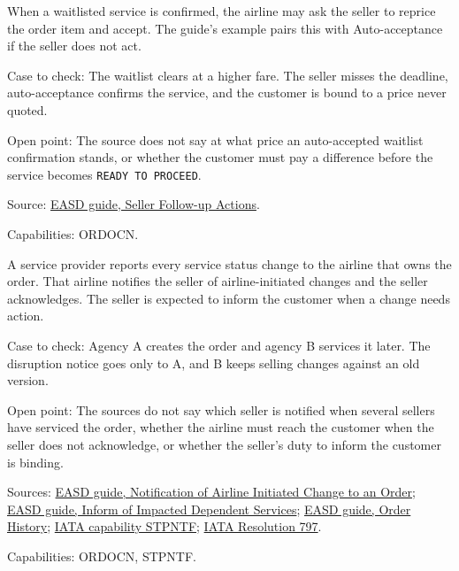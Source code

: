 \begin{definition}
  \label{def:airline-change-reprice-and-accept}
  \notready
  When a waitlisted service is confirmed, the airline may ask the seller to
  reprice the order item and accept. The guide's example pairs this with
  Auto-acceptance if the seller does not act.

  Case to check: The waitlist clears at a higher fare. The seller misses the
  deadline, auto-acceptance confirms the service, and the customer is bound
  to a price never quoted.

  Open point: The source does not say at what price an auto-accepted
  waitlist confirmation stands, or whether the customer must pay a
  difference before the service becomes \texttt{READY TO PROCEED}.

  Source: \href{https://standards.atlassian.net/wiki/spaces/EASD/pages/574849094}{EASD guide, Seller Follow-up Actions}.

  Capabilities: ORDOCN.
\end{definition}

\begin{definition}
  \label{def:airline-change-notice-chain}
  \notready
  A service provider reports every service status change to the airline that
  owns the order. That airline notifies the seller of airline-initiated
  changes and the seller acknowledges. The seller is expected to inform the
  customer when a change needs action.

  Case to check: Agency A creates the order and agency B services it later.
  The disruption notice goes only to A, and B keeps selling changes against
  an old version.

  Open point: The sources do not say which seller is notified when several
  sellers have serviced the order, whether the airline must reach the
  customer when the seller does not acknowledge, or whether the seller's
  duty to inform the customer is binding.

  Sources: \href{https://standards.atlassian.net/wiki/spaces/EASD/pages/574455903}{EASD guide, Notification of Airline Initiated Change to an Order};
  \href{https://standards.atlassian.net/wiki/spaces/EASD/pages/672825400}{EASD guide, Inform of Impacted Dependent Services};
  \href{https://standards.atlassian.net/wiki/spaces/EASD/pages/574652557}{EASD guide, Order History};
  \href{https://retailing.iata.org/armi/docs/STPNTF/}{IATA capability STPNTF};
  \href{https://www.iata.org/contentassets/72cbd60393ff42b5975d90ce9e049a7d/oneorder-resolution-797.pdf}{IATA Resolution 797}.

  Capabilities: ORDOCN, STPNTF.
\end{definition}
